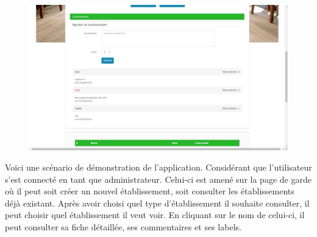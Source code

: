 \begin{figure}[h!]
\begin{minipage}[b]{0.35\linewidth}
   \end{minipage}\hfill
   \begin{minipage}[b]{0.35\linewidth}   
      \centering \includegraphics[scale=0.15]{com}
   \end{minipage}
\end{figure}
\noindent Voici une scénario de démonstration de l'application. Considérant que l'utilisateur s'est connecté en tant que administrateur. Celui-ci est amené sur la page de garde où il peut soit créer un nouvel établissement, soit consulter les établissements déjà existant. Après avoir choisi quel type d'établissement il souhaite consulter, il peut choisir quel établissement il veut voir. En cliquant sur le nom de celui-ci, il peut consulter sa fiche détaillée, ses commentaires et ses labels.